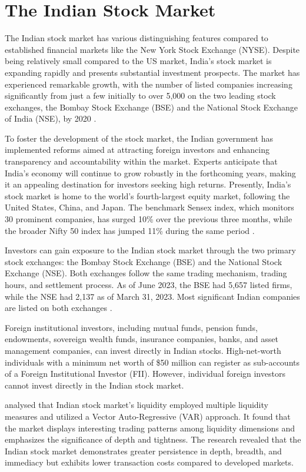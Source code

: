 \section{The Indian Stock Market}
The Indian stock market has various distinguishing features compared to established financial markets like the New York Stock Exchange (NYSE). Despite being relatively small compared to the US market, India's stock market is expanding rapidly and presents substantial investment prospects. The market has experienced remarkable growth, with the number of listed companies increasing significantly from just a few initially to over 5,000 on the two leading stock exchanges, the Bombay Stock Exchange (BSE) and the National Stock Exchange of India (NSE), by 2020 \citep{Naik2020}.

To foster the development of the stock market, the Indian government has implemented reforms aimed at attracting foreign investors and enhancing transparency and accountability within the market. Experts anticipate that India's economy will continue to grow robustly in the forthcoming years, making it an appealing destination for investors seeking high returns. Presently, India's stock market is home to the world's fourth-largest equity market, following the United States, China, and Japan. The benchmark Sensex index, which monitors 30 prominent companies, has surged 10\% over the previous three months, while the broader Nifty 50 index has jumped 11\% during the same period \citep{Hiransha2018}.

Investors can gain exposure to the Indian stock market through the two primary stock exchanges: the Bombay Stock Exchange (BSE) and the National Stock Exchange (NSE). Both exchanges follow the same trading mechanism, trading hours, and settlement process. As of June 2023, the BSE had 5,657 listed firms, while the NSE had 2,137 as of March 31, 2023. Most significant Indian companies are listed on both exchanges \citep{Yadav2023}.

Foreign institutional investors, including mutual funds, pension funds, endowments, sovereign wealth funds, insurance companies, banks, and asset management companies, can invest directly in Indian stocks. High-net-worth individuals with a minimum net worth of \$50 million can register as sub-accounts of a Foreign Institutional Investor (FII). However, individual foreign investors cannot invest directly in the Indian stock market.

\citep{Surana2023} analysed that Indian stock market's liquidity employed multiple liquidity measures and utilized a Vector Auto-Regressive (VAR) approach. It found that the market displays interesting trading patterns among liquidity dimensions and emphasizes the significance of depth and tightness. The research revealed that the Indian stock market demonstrates greater persistence in depth, breadth, and immediacy but exhibits lower transaction costs compared to developed markets.

